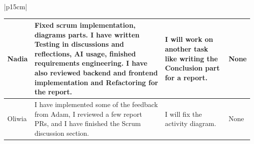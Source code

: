 \begin{table}[H]
    \centering
    \begin{tabular}{|p{15cm}|} 
        \hline
        \begin{table}[H]
            \begin{tabular}{|p{1.75cm}|p{4cm}|p{4cm}|p{4cm}|}
                \hline
                \cellcolor[HTML]{d4d4d4} Nadia & Fixed scrum implementation, diagrams parts. I have written Testing in discussions and reflections, AI usage, finished requirements engineering. I have also reviewed backend and frontend implementation and Refactoring for the report. & I will work on another task like writing the Conclusion part for a report.  & None \\
                \hline
                \cellcolor[HTML]{d4d4d4} Oliwia & I have implemented some of the feedback from Adam, I reviewed a few report PRs, and I have finished the Scrum discussion section.  & I will fix the activity diagram. & None \\
                \hline
            \end{tabular}
        \end{table}
        \\
        \hline
    \end{tabular}
\end{table}

